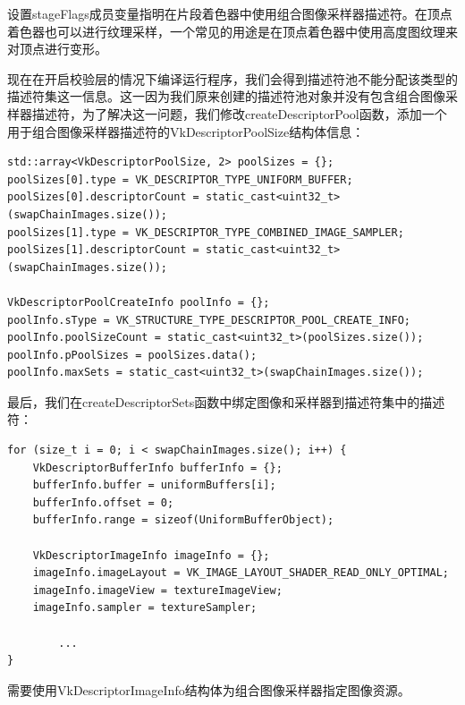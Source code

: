 \documentclass{ctexart}
\begin{document}
设置stageFlags成员变量指明在片段着色器中使用组合图像采样器描述符。在顶点着色器也可以进行纹理采样，一个常见的用途是在顶点着色器中使用高度图纹理来对顶点进行变形。

现在在开启校验层的情况下编译运行程序，我们会得到描述符池不能分配该类型的描述符集这一信息。这一因为我们原来创建的描述符池对象并没有包含组合图像采样器描述符，为了解决这一问题，我们修改createDescriptorPool函数，添加一个用于组合图像采样器描述符的VkDescriptorPoolSize结构体信息：

\begin{lstlisting}[language={[ANSI]C}]
std::array<VkDescriptorPoolSize, 2> poolSizes = {};
poolSizes[0].type = VK_DESCRIPTOR_TYPE_UNIFORM_BUFFER;
poolSizes[0].descriptorCount = static_cast<uint32_t>(swapChainImages.size());
poolSizes[1].type = VK_DESCRIPTOR_TYPE_COMBINED_IMAGE_SAMPLER;
poolSizes[1].descriptorCount = static_cast<uint32_t>(swapChainImages.size());

VkDescriptorPoolCreateInfo poolInfo = {};
poolInfo.sType = VK_STRUCTURE_TYPE_DESCRIPTOR_POOL_CREATE_INFO;
poolInfo.poolSizeCount = static_cast<uint32_t>(poolSizes.size());
poolInfo.pPoolSizes = poolSizes.data();
poolInfo.maxSets = static_cast<uint32_t>(swapChainImages.size());
\end{lstlisting}

最后，我们在createDescriptorSets函数中绑定图像和采样器到描述符集中的描述符：

\begin{lstlisting}[language={[ANSI]C}]
for (size_t i = 0; i < swapChainImages.size(); i++) {
	VkDescriptorBufferInfo bufferInfo = {};
	bufferInfo.buffer = uniformBuffers[i];
	bufferInfo.offset = 0;
	bufferInfo.range = sizeof(UniformBufferObject);

	VkDescriptorImageInfo imageInfo = {};
	imageInfo.imageLayout = VK_IMAGE_LAYOUT_SHADER_READ_ONLY_OPTIMAL;
	imageInfo.imageView = textureImageView;
	imageInfo.sampler = textureSampler;

		...
}
\end{lstlisting}

需要使用VkDescriptorImageInfo结构体为组合图像采样器指定图像资源。
\end{document}
